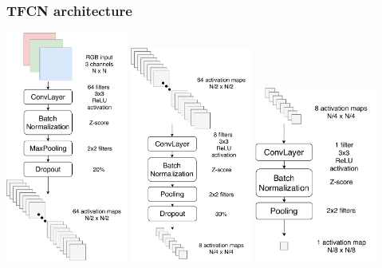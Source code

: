 \documentclass[usenames,dvipsnames,10pt]{beamer}
\begin{document}
\begin{frame}
\frametitle{TFCN architecture}
\hspace{0.5cm}
\includegraphics[width=0.3\textwidth]{graphics/TFCN1.pdf}
\hspace{0.12cm}
\includegraphics[width=0.3\textwidth]{graphics/TFCN2.pdf}
\hspace{0.12cm}
\includegraphics[width=0.3\textwidth]{graphics/TFCN3.pdf}
\end{frame}
\end{document}
